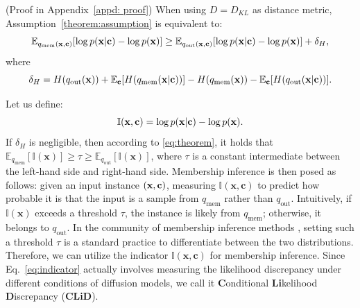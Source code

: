 \begin{theorem}
\label{theorem:theorem}
(Proof in Appendix~\ref{appd: proof})
When using \(D=D_{KL}\) as distance metric, Assumption~\ref{theorem:assumption} is equivalent to:
\begin{equation}
\label{eq:theorem}
       \mathbb{E}_{q_{\text{mem}}(\mathbf{x}, \mathbf{c})}[\log p(\mathbf{x}|\mathbf{c}) - \log p(\mathbf{x})]
          \geq        
       \mathbb{E}_{q_{\text{out}}(\mathbf{x}, \mathbf{c})}[\log p(\mathbf{x}|\mathbf{c}) - \log p(\mathbf{x})]
       + \delta_{H},
\end{equation}
where
\begin{equation}
    \delta_H = H(q_{\text{out}}(\mathbf{x})) + \mathbb{E}_{\mathbf{c}}[H(q_{\text{mem}}(\mathbf{x}|\mathbf{c}))]
       - H(q_{\text{mem}}(\mathbf{x})) - \mathbb{E}_{\mathbf{c}}[H(q_{\text{out}}(\mathbf{x}|\mathbf{c}))].
\end{equation}
\end{theorem}



Let us define: 
\begin{equation}\label{eq:indicator}
    \mathbb{I}(\mathbf{x},\mathbf{c}) = \log p(\mathbf{x} | \mathbf{c}) - \log p(\mathbf{x}).
\end{equation} 
If \(\delta_H\) is negligible, then according to \cref{eq:theorem}, it holds that \(\mathbb{E}_{q_{\text{mem}}}[\mathbb{I}(\mathbf{x})] \geq \tau \geq \mathbb{E}_{q_{\text{out}}}[\mathbb{I}(\mathbf{x})]\), where \(\tau\) is a constant intermediate between the left-hand side and right-hand side. 
Membership inference is then posed as follows: given an input instance \((\mathbf{x}, \mathbf{c})\), measuring \(\mathbb{I}(\mathbf{x}, \mathbf{c})\) to predict how probable it is that the input is a sample from \(q_{\text{mem}}\) rather than \(q_{\text{out}}\). 
Intuitively, if \(\mathbb{I}(\mathbf{x})\) exceeds a threshold \(\tau\), the instance is likely from \(q_{\text{mem}}\); otherwise, it belongs to \(q_{\text{out}}\). In the community of membership inference methods 
\cite{yeom2018privacy,chen2020gan,carlini2022membership, carlini2023extracting,matsumoto2023membership, duan2023diffusion, kong2023efficient, fu2023probabilistic}
, setting such a threshold \(\tau\) is a standard practice to differentiate between the two distributions. 
Therefore, we can utilize the indicator \(\mathbb{I}(\mathbf{x}, \mathbf{c})\) for membership inference.
Since Eq.~\eqref{eq:indicator}  actually involves measuring the likelihood discrepancy under different conditions of diffusion models, we call it \textbf{C}onditional \textbf{Li}kelihood \textbf{D}iscrepancy (\textbf{CLiD}).


